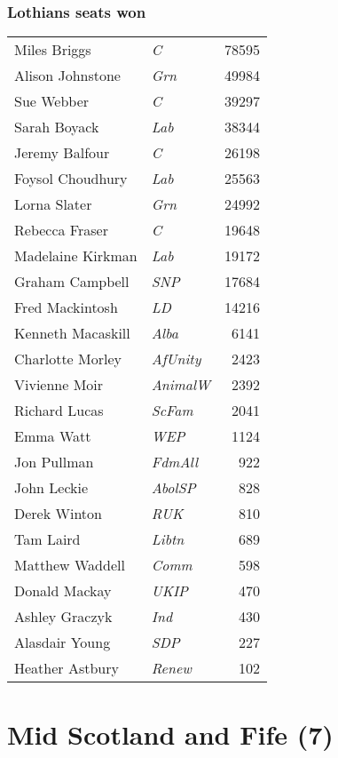 \subsubsection*{Lothians seats won}

{\footnotesize
\begin{tabular*}{\columnwidth}{@{\extracolsep{\fill}} p{} >{\itshape}l r @{\extracolsep{\fill}}}
	Miles Briggs & C & 78595\\%
	Alison Johnstone & Grn & 49984\\%
	Sue Webber & C & 39297\\%
	Sarah Boyack & Lab & 38344\\%
	Jeremy Balfour & C & 26198\\%
	Foysol Choudhury & Lab & 25563\\%
	Lorna Slater & Grn & 24992\\%
	\hline
	Rebecca Fraser & C & 19648\\
	Madelaine Kirkman & Lab & 19172\\
	Graham Campbell & SNP & 17684\\
	Fred Mackintosh & LD & 14216\\
	Kenneth Macaskill & Alba & 6141\\
	Charlotte Morley & AfUnity & 2423\\
	Vivienne Moir & AnimalW & 2392\\
	Richard Lucas & ScFam & 2041\\
	Emma Watt & WEP & 1124\\
	Jon Pullman & FdmAll & 922\\
	John Leckie & AbolSP & 828\\
	Derek Winton & RUK & 810\\
	Tam Laird & Libtn & 689\\
	Matthew Waddell & Comm & 598\\
	Donald Mackay & UKIP & 470\\
	Ashley Graczyk & Ind & 430\\
	Alasdair Young & SDP & 227\\
	Heather Astbury & Renew & 102\\
\end{tabular*}

}

\vfill\eject

\section[Mid Scotland and Fife]{Mid Scotland and Fife (7)}

